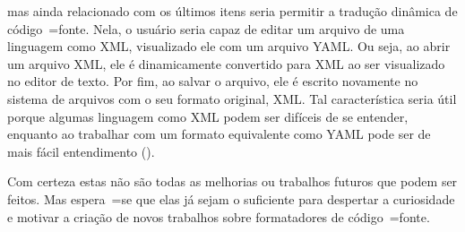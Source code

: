 \begin{enumerate}
mas ainda relacionado com os últimos itens seria permitir a tradução dinâmica de código~=fonte.
Nela,
o usuário seria capaz de editar um arquivo de uma linguagem como XML,
visualizado ele com um arquivo YAML.
Ou seja,
ao abrir um arquivo XML,
ele é dinamicamente convertido para XML ao ser visualizado no editor de texto.
Por fim,
ao salvar o arquivo,
ele é escrito novamente no sistema de arquivos com o seu formato original,
XML.
Tal característica seria útil porque algumas linguagem como XML podem ser difíceis de se entender,
enquanto ao trabalhar com um formato equivalente como YAML pode ser de mais fácil entendimento ().
\end{enumerate}%

Com certeza estas não são todas as melhorias ou
trabalhos futuros que podem ser feitos.
Mas espera~=se que elas já sejam o suficiente para despertar a curiosidade e
motivar a criação de novos trabalhos sobre formatadores de código~=fonte.

